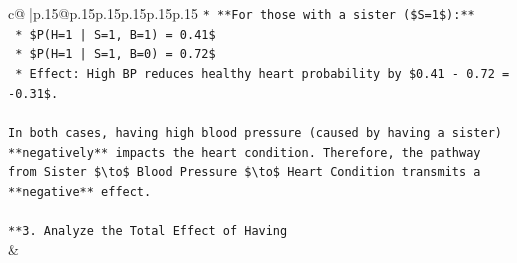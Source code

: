 \documentclass{article}
\begin{document}
{\begin{supertabular}{c@{$\;$}|p{.15\linewidth}@{}p{.15\linewidth}p{.15\linewidth}p{.15\linewidth}p{.15\linewidth}p{.15\linewidth}}
{{{\texttt{*   **For those with a sister (\$S=1\$):**} \\
\texttt{    *   \$P(H=1 | S=1, B=1) = 0.41\$} \\
\texttt{    *   \$P(H=1 | S=1, B=0) = 0.72\$} \\
\texttt{    *   Effect: High BP reduces healthy heart probability by \$0.41 {-} 0.72 = {-}0.31\$.} \\
\\ 
\texttt{In both cases, having high blood pressure (caused by having a sister) **negatively** impacts the heart condition. Therefore, the pathway from Sister \$\textbackslash{}to\$ Blood Pressure \$\textbackslash{}to\$ Heart Condition transmits a **negative** effect.} \\
\\ 
\texttt{**3. Analyze the Total Effect of Having} \\
            }
        }
    }
    & \\ \\


\end{supertabular}}
\end{document}

